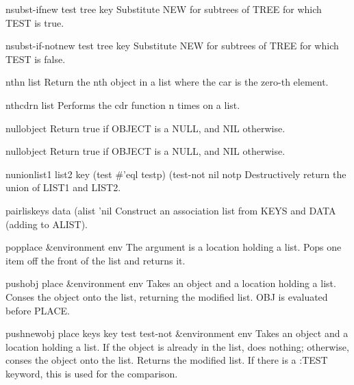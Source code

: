 \begin{function}{nsubst-if}{new test tree \key key}{}
  Substitute NEW for subtrees of TREE for which TEST is true.
\end{function}

\begin{function}{nsubst-if-not}{new test tree \key key}{}
  Substitute NEW for subtrees of TREE for which TEST is false.
\end{function}

\begin{accessor}{nth}{n list}{}
  Return the nth object in a list where the car is the zero-th element.
\end{accessor}

\begin{function}{nthcdr}{n list}{}
  Performs the cdr function n times on a list.
\end{function}

\begin{function}{null}{object}{}
  Return true if OBJECT is a NULL, and NIL otherwise.
\end{function}

\begin{class}{null}{object}{}
  Return true if OBJECT is a NULL, and NIL otherwise.
\end{class}

\begin{function}{nunion}{list1 list2 \key key (test #'eql testp) (test-not nil notp}{}
  Destructively return the union of LIST1 and LIST2.
\end{function}

\begin{function}{pairlis}{keys data \op (alist 'nil}{}
  Construct an association list from KEYS and DATA (adding to ALIST).
\end{function}

\begin{macro}{pop}{place &environment env}{}
  The argument is a location holding a list. Pops one item off the front
  of the list and returns it.
\end{macro}

\begin{macro}{push}{obj place &environment env}{}
  Takes an object and a location holding a list. Conses the object onto
  the list, returning the modified list. OBJ is evaluated before PLACE.
\end{macro}

\begin{macro}{pushnew}{obj place \rest keys \key key test test-not &environment env}{}
  Takes an object and a location holding a list. If the object is
  already in the list, does nothing; otherwise, conses the object onto
  the list. Returns the modified list. If there is a :TEST keyword, this
  is used for the comparison.
\end{macro}

